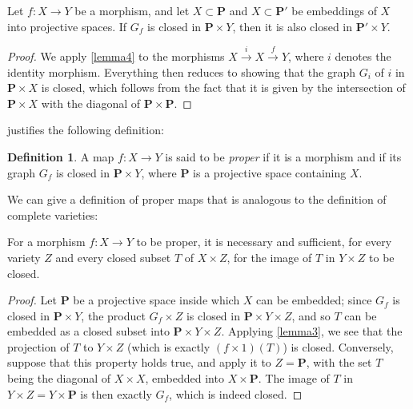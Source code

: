\documentclass{article}
\theoremstyle{plain}
\newenvironment{proposition}[1]
    {\renewcommand\theinnercustomproposition{#1}\innercustomproposition}
    {\endinnercustomproposition}
\newenvironment{lemma}[1]
    {\renewcommand\theinnercustomlemma{#1}\innercustomlemma}
    {\endinnercustomlemma}
\theoremstyle{definition}
\newtheorem*{definition}{Definition}
\newcommand{\PP}{\mathbf{P}}
\newcommand{\oldpage}[1]{\marginpar{\footnotesize$\Big\vert$ \textit{p.~#1}}}
\begin{document}
\begin{lemma}{5}
\label{lemma5}
  Let $f\colon X\to Y$ be a morphism, and let $X\subset \PP$ and $X\subset \PP'$ be embeddings of $X$ into projective spaces.
  If $G_f$ is closed in $\PP\times Y$, then it is also closed in $\PP'\times Y$.
\end{lemma}

\begin{proof}
  We apply \cref{lemma4} to the morphisms $X\xrightarrow{i}X\xrightarrow{f}Y$, where $i$ denotes the identity morphism.
  Everything then reduces to showing that the graph $G_i$ of $i$ in $\PP\times X$ is closed, which follows from the fact that it is given by the intersection of $\PP\times X$ with the diagonal of $\PP\times \PP$.
\end{proof}

 justifies the following definition:

\begin{definition}
  A map $f\colon X\to Y$ is said to be \emph{proper} if it is a morphism and if its graph $G_f$ is closed in $\PP\times Y$, where $\PP$ is a projective space containing $X$.
\end{definition}

We can give a definition of proper maps that is analogous to the definition of complete varieties:

\begin{proposition}{3}
\label{proposition3}
  For a morphism $f\colon X\to Y$ to be proper, it is necessary and sufficient, for every variety $Z$ and every closed subset $T$ of $X\times Z$, for the image of $T$ in $Y\times Z$ to be closed.
\end{proposition}

\begin{proof}
  Let $\PP$ be a projective space inside which $X$ can be embedded;
  since $G_f$ is closed in $\PP\times Y$, the product $G_f\times Z$ is closed in $\PP\times Y\times Z$, and so $T$ can be embedded as a closed subset into $\PP\times Y\times Z$.
\oldpage{101}
  Applying \cref{lemma3}, we see that the projection of $T$ to $Y\times Z$ (which is exactly $(f\times1)(T)$) is closed.
  Conversely, suppose that this property holds true, and apply it to $Z=\PP$, with the set $T$ being the diagonal of $X\times X$, embedded into $X\times \PP$.
  The image of $T$ in $Y\times Z=Y\times \PP$ is then exactly $G_f$, which is indeed closed.
\end{proof}
\end{document}
